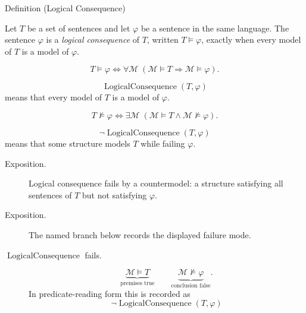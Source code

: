 \begin{definitionbox}{Definition (Logical Consequence)}
\begin{definition}
\label{def:log-consequence}
Let \(T\) be a set of sentences and let \(\varphi\) be a sentence in the same
language. The sentence \(\varphi\) is a \emph{logical consequence} of \(T\),
written \(T\models\varphi\), exactly when every model of \(T\) is a model of
\(\varphi\).
\end{definition}
\end{definitionbox}

\begin{remark*}
\[
T\models\varphi
\Longleftrightarrow
\forall \mathcal M\;(\mathcal M\models T \Rightarrow \mathcal M\models\varphi).
\]
\end{remark*}

\begin{remark*}
\[
  \operatorname{LogicalConsequence}(T,\varphi)
\] means that every model of
\(T\) is a model of \(\varphi\).
\end{remark*}

\begin{remark*}
\[
T\not\models\varphi
\Longleftrightarrow
\exists \mathcal M\;(\mathcal M\models T \land \mathcal M\not\models\varphi).
\]
\end{remark*}

\begin{remark*}
\[
  \neg\operatorname{LogicalConsequence}(T,\varphi)
\] means that some structure
models \(T\) while failing \(\varphi\).
\end{remark*}

\begin{remark*}
\begin{description}
  \item[Exposition.] Logical consequence fails by a countermodel: a structure satisfying all
sentences of \(T\) but not satisfying \(\varphi\).
\end{description}
\end{remark*}

\begin{remark*}
\begin{description}
  \item[Exposition.] The named branch below records the displayed failure mode.
\item[\(\operatorname{LogicalConsequence}\) fails.] \[
\underbrace{\mathcal M\models T}_{\text{premises true}}
\qquad
\underbrace{\mathcal M\not\models\varphi}_{\text{conclusion false}}.
\]
  In predicate-reading form this is recorded as
  \[
    \neg\operatorname{LogicalConsequence}(T,\varphi)
  \]
\end{description}
\end{remark*}

